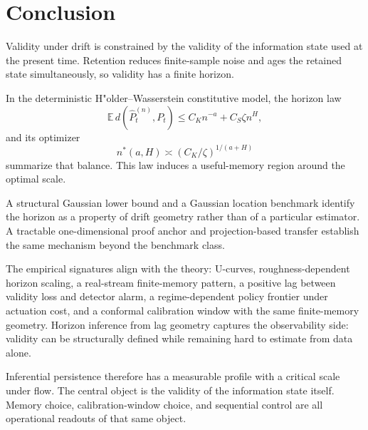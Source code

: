 \section{Conclusion}\label{sec:conclusion}

Validity under drift is constrained by the validity of the information state
used at the present time. Retention reduces finite-sample noise and ages the
retained state simultaneously, so validity has a finite horizon.

In the deterministic H"older--Wasserstein constitutive model, the horizon law
\[
  \mathbb E\,d\!\left(\widehat P_t^{(n)},P_t\right)
  \le C_K n^{-a} + C_S\zeta n^H,
\]
and its optimizer
\[
  n^*(a,H) \asymp (C_K/\zeta)^{1/(a+H)}
\]
summarize that balance. This law induces a useful-memory region around the
optimal scale.

A structural Gaussian lower bound and a Gaussian location benchmark identify the
horizon as a property of drift geometry rather than of a particular estimator.
A tractable one-dimensional proof anchor and projection-based transfer establish
the same mechanism beyond the benchmark class.

The empirical signatures align with the theory: U-curves,
roughness-dependent horizon scaling, a real-stream finite-memory pattern, a
positive lag between validity loss and detector alarm, a regime-dependent policy
frontier under actuation cost, and a conformal calibration window with the same
finite-memory geometry. Horizon inference from lag geometry captures the
observability side: validity can be structurally defined while remaining hard to
estimate from data alone.

Inferential persistence therefore has a measurable profile with a critical scale
under flow. The central object is the validity of the information state itself.
Memory choice, calibration-window choice, and sequential control are all
operational readouts of that same object.
